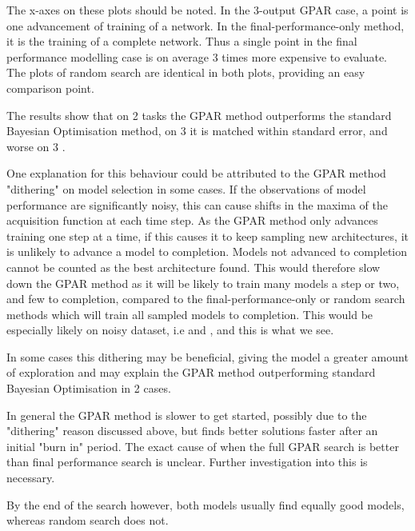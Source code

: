 The x-axes on these plots should be noted. In the 3-output GPAR case, a point is one advancement of training of a network. In the final-performance-only method, it is the training of a complete network. Thus a single point in the final performance modelling case is on average 3 times more expensive to evaluate. The plots of random search are identical in both plots, providing an easy comparison point.

The results show that on 2 tasks the GPAR method outperforms the standard Bayesian Optimisation method, on 3 it is matched within standard error, and worse on 3 .

One explanation for this behaviour could be attributed to the GPAR method "dithering" on model selection in some cases. If the observations of model performance are significantly noisy, this can cause shifts in the maxima of the acquisition function at each time step. As the GPAR method only advances training one step at a time, if this causes it to keep sampling new architectures, it is unlikely to advance a model to completion. Models not advanced to completion cannot be counted as the best architecture found. This would therefore slow down the GPAR method as it will be likely to train many models a step or two, and few to completion, compared to the final-performance-only or random search methods which will train all sampled models to completion. This would be especially likely on noisy dataset, i.e \bostonname \: and \yachtname, and this is what we see.

In some cases this dithering may be beneficial, giving the model a greater amount of exploration and may explain the GPAR method outperforming standard Bayesian Optimisation in 2 cases.

In general the GPAR method is slower to get started, possibly due to the "dithering" reason discussed above, but finds better solutions faster after an initial "burn in" period. The exact cause of when the full GPAR search is better than final performance search is unclear. Further investigation into this is necessary.

By the end of the search however, both models usually find equally good models, whereas random search does not.

